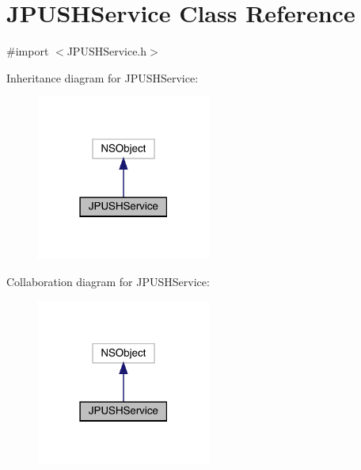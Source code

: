 \hypertarget{interface_j_p_u_s_h_service}{}\section{J\+P\+U\+S\+H\+Service Class Reference}
\label{interface_j_p_u_s_h_service}


{\ttfamily \#import $<$J\+P\+U\+S\+H\+Service.\+h$>$}



Inheritance diagram for J\+P\+U\+S\+H\+Service\+:\nopagebreak
\begin{figure}[H]
\begin{center}
\leavevmode
\includegraphics[width=162pt]{interface_j_p_u_s_h_service__inherit__graph}
\end{center}
\end{figure}


Collaboration diagram for J\+P\+U\+S\+H\+Service\+:\nopagebreak
\begin{figure}[H]
\begin{center}
\leavevmode
\includegraphics[width=162pt]{interface_j_p_u_s_h_service__coll__graph}
\end{center}
\end{figure}
